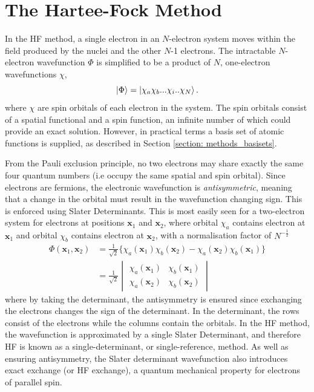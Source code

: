 \section{The Hartee-Fock Method}\label{section: methods_HF}
In the \ac{HF} method, a single electron in an $N$-electron system moves within the field produced by the nuclei and the other $N$-1 electrons.\cite{hartree_1928} The intractable $N$-electron wavefunction $\Phi$ is simplified to be a product of $N$, one-electron wavefunctions $\chi$,
\begin{equation}
\ket{\Phi}=\ket{\chi_{a}\chi_{b}...\chi_{i}..\chi_{N}}.
\end{equation}
where $\chi$ are spin orbitals of each electron in the system. The spin orbitals consist of a spatial functional and a spin function, an infinite number of which could provide an exact solution. However, in practical terms a basis set of atomic functions is supplied, as described in Section \ref{section: methods_basisets}.\cite{szabo1996}
 
 From the Pauli exclusion principle, no two electrons may share exactly the same four quantum numbers (i.e occupy the same spatial and spin orbital). Since electrons are fermions, the electronic wavefunction is \textit{antisymmetric}, meaning that a change in the orbital must result in the wavefunction changing sign. This is enforced using Slater Determinants.\cite{Slater1929} This is most easily seen for a two-electron system for electrons at positions $\bm{x}_{1}$ and $\bm{x}_{2}$, where orbital $\chi_{a}$ contains electron at $\bm{x}_1$ and orbital $\chi_{b}$ contains electron at $\bm{x}_2$, with a normalisation factor of $N^{-\frac{1}{2}}$
\begin{equation}
\begin{split}
\Phi(\bm{x}_{1},\bm{x}_{2})&=\frac{1}{\sqrt{2}}\{\chi_{a}(\bm{x}_{1})\chi_{b}(\bm{x}_{2})-\chi_{a}(\bm{x}_{2})\chi_{b}(\bm{x}_{1})\}\\
&=\frac{1}{\sqrt{2}}
\begin{vmatrix}
\chi_{a}(\bm{x}_{1})&\chi_{b}(\bm{x}_{1})\\
\chi_{a}(\bm{x}_{2})&\chi_{b}(\bm{x}_{2})
\end{vmatrix}
\end{split}
\end{equation}
where by taking the determinant, the antisymmetry is ensured since exchanging the electrons changes the sign of the determinant. In the determinant, the rows consist of the electrons while the columns contain the orbitals. In the \ac{HF} method, the wavefunction is approximated by a single Slater Determinant, and therefore \ac{HF} is known as a single-determinant, or single-reference, method.  As well as ensuring antisymmetry, the Slater determinant wavefunction also introduces exact exchange (or HF exchange), a quantum mechanical property for electrons of parallel spin.\cite{szabo1996}

